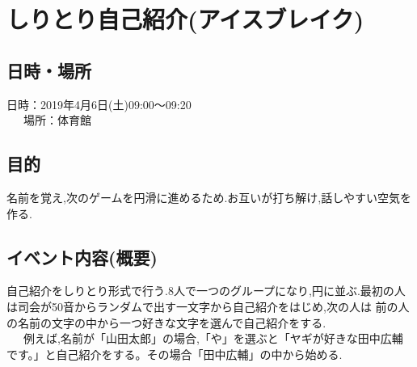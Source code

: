 \section{しりとり自己紹介(アイスブレイク)}
\subsection{日時・場所}
日時：2019年4月6日(土)09:00〜09:20\\
\ \ \ 場所：体育館\\

\subsection{目的}
名前を覚え,次のゲームを円滑に進めるため.お互いが打ち解け,話しやすい空気を作る.
\subsection{イベント内容(概要)}
自己紹介をしりとり形式で行う.8人で一つのグループになり,円に並ぶ.最初の人は司会が50音からランダムで出す一文字から自己紹介をはじめ,次の人は
前の人の名前の文字の中から一つ好きな文字を選んで自己紹介をする.\\
\ \ \ 例えば,名前が「山田太郎」の場合,「や」を選ぶと「ヤギが好きな田中広輔です。」と自己紹介をする。その場合「田中広輔」の中から始める.
